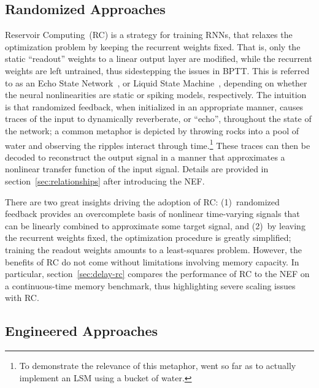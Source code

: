 \subsection{Randomized Approaches}

Reservoir Computing~(RC) is a strategy for training RNNs, that relaxes the optimization problem by keeping the recurrent weights fixed.
That is, only the static ``readout'' weights to a linear output layer are modified, while the recurrent weights are left untrained, thus sidestepping the issues in BPTT.
This is referred to as an Echo State Network~\citep[ESN;][]{jaeger2001echo}, or Liquid State Machine~\citep[LSM;][]{maass2002real}, depending on whether the neural nonlinearities are static or spiking models, respectively.
The intuition is that randomized feedback, when initialized in an appropriate manner, causes traces of the input to dynamically reverberate, or ``echo'', throughout the state of the network; a common metaphor is depicted by throwing rocks into a pool of water and observing the ripples interact through time.\footnote{To demonstrate the relevance of this metaphor, \citet{fernando2003pattern} went so far as to actually implement an LSM using a bucket of water.}
These traces can then be decoded to reconstruct the output signal in a manner that approximates a nonlinear transfer function of the input signal.
Details are provided in section~\ref{sec:relationships} after introducing the NEF.

There are two great insights driving the adoption of RC: (1)~randomized feedback provides an overcomplete basis of nonlinear time-varying signals that can be linearly combined to approximate some target signal, and (2)~by leaving the recurrent weights fixed, the optimization procedure is greatly simplified; training the readout weights amounts to a least-squares problem.
However, the benefits of RC do not come without limitations involving memory capacity. 
In particular, section~\ref{sec:delay-rc} compares the performance of RC to the NEF on a continuous-time memory benchmark, thus highlighting severe scaling issues with RC.

\subsection{Engineered Approaches}

